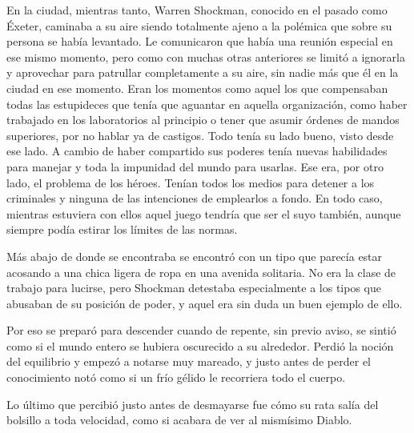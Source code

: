 \parbreak
En la ciudad, mientras tanto, Warren Shockman, conocido en el pasado como Éxeter, caminaba a su aire siendo totalmente ajeno a la polémica que sobre su persona se había levantado. Le comunicaron que había una reunión especial en ese mismo momento, pero como con muchas otras anteriores se limitó a ignorarla y aprovechar para patrullar completamente a su aire, sin nadie más que él en la ciudad en ese momento. Eran los momentos como aquel los que compensaban todas las estupideces que tenía que aguantar en aquella organización, como haber trabajado en los laboratorios al principio o tener que asumir órdenes de mandos superiores, por no hablar ya de castigos. Todo tenía su lado bueno, visto desde ese lado. A cambio de haber compartido sus poderes tenía nuevas habilidades para manejar y toda la impunidad del mundo para usarlas. Ese era, por otro lado, el problema de los héroes. Tenían todos los medios para detener a los criminales y ninguna de las intenciones de emplearlos a fondo. En todo caso, mientras estuviera con ellos aquel juego tendría que ser el suyo también, aunque siempre podía estirar los límites de las normas.

Más abajo de donde se encontraba se encontró con un tipo que parecía estar acosando a una chica ligera de ropa en una avenida solitaria. No era la clase de trabajo para lucirse, pero Shockman detestaba especialmente a los tipos que abusaban de su posición de poder, y aquel era sin duda un buen ejemplo de ello.

Por eso se preparó para descender cuando de repente, sin previo aviso, se sintió como si el mundo entero se hubiera oscurecido a su alrededor. Perdió la noción del equilibrio y empezó a notarse muy mareado, y justo antes de perder el conocimiento notó como si un frío gélido le recorriera todo el cuerpo.

Lo último que percibió justo antes de desmayarse fue cómo su rata salía del bolsillo a toda velocidad, como si acabara de ver al mismísimo Diablo.

\endinput
